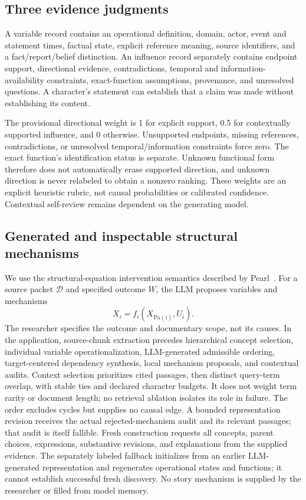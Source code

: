 \documentclass{svproc}
\begin{document}
\subsection{Three evidence judgments}
A variable record contains an operational definition, domain, actor, event and statement times, factual state, explicit reference meaning, source identifiers, and a fact/report/belief distinction. An influence record separately contains endpoint support, directional evidence, contradictions, temporal and information-availability constraints, exact-function assumptions, provenance, and unresolved questions. A character's statement can establish that a claim was made without establishing its content.

The provisional directional weight is 1 for explicit support, 0.5 for contextually supported influence, and 0 otherwise. Unsupported endpoints, missing references, contradictions, or unresolved temporal/information constraints force zero. The exact function's identification status is separate. Unknown functional form therefore does not automatically erase supported direction, and unknown direction is never relabeled to obtain a nonzero ranking. These weights are an explicit heuristic rubric, not causal probabilities or calibrated confidence. Contextual self-review remains dependent on the generating model.

\subsection{Generated and inspectable structural mechanisms}
We use the structural-equation intervention semantics described by Pearl~\cite{pearl}. For a source packet $\mathcal D$ and specified outcome $W$, the LLM proposes variables and mechanisms
\begin{equation}
X_i=f_i(X_{\mathrm{Pa}(i)},U_i).
\end{equation}
The researcher specifies the outcome and documentary scope, not its causes. In the application, source-chunk extraction precedes hierarchical concept selection, individual variable operationalization, LLM-generated admissible ordering, target-centered dependency synthesis, local mechanism proposals, and contextual audits. Context selection prioritizes cited passages, then distinct query-term overlap, with stable ties and declared character budgets. It does not weight term rarity or document length; no retrieval ablation isolates its role in failure. The order excludes cycles but supplies no causal edge. A bounded representation revision receives the actual rejected-mechanism audit and its relevant passages; that audit is itself fallible. Fresh construction requests all concepts, parent choices, expressions, substantive revisions, and explanations from the supplied evidence. The separately labeled fallback initializes from an earlier LLM-generated representation and regenerates operational states and functions; it cannot establish successful fresh discovery. No story mechanism is supplied by the researcher or filled from model memory.
\end{document}
